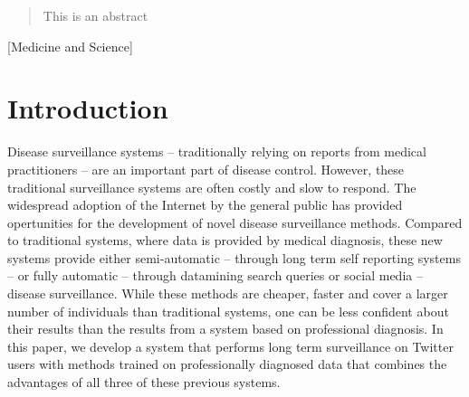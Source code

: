\documentclass{acm_proc_article-sp}
\begin{document}
\maketitle
\begin{abstract}
This is an abstract
\end{abstract}

[Medicine and Science]



\section{Introduction}

Disease surveillance systems -- traditionally relying on reports from medical practitioners -- are an important part of disease control. However, these traditional surveillance systems are often costly and slow to respond\cite{Heymann:2001,Chan2010,Salathe:2012ez}.  The widespread adoption of the Internet by the general public has provided opertunities for the development of novel disease surveillance methods. Compared to traditional systems, where data is provided by medical diagnosis, these new systems provide either semi-automatic -- through long term self reporting systems\cite{Marquet:2005tb,VanNoort:2007uk} -- or fully automatic -- through datamining search queries or social media -- disease surveillance. While these methods are cheaper, faster and cover a larger number of individuals than traditional systems, one can be less confident about their results than the results from a system based on professional diagnosis. In this paper, we develop a system that performs long term surveillance on Twitter users with methods trained on professionally diagnosed data that combines the advantages of all three of these previous systems.
\end{document}
